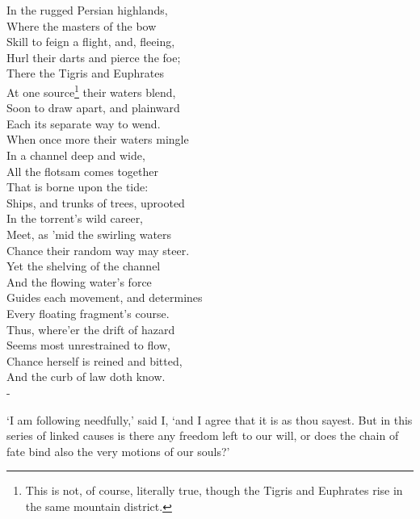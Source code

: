 \documentclass[12pt]{book}
\newenvironment{ipoem}[1]%
  {\setcounter{poemindentevery}{#1}\begin{poem}\small}%
  {\end{poem}\setcounter{poemindentevery}{0}}
\begin{document}
\begin{ipoem}{2}
    In the rugged Persian highlands, \\
      Where the masters of the bow \\
    Skill to feign a flight, and, fleeing, \\
      Hurl their darts and pierce the foe; \\
    There the Tigris and Euphrates \\
      At one source\footnote{This is not, of course, literally true, though the Tigris and Euphrates rise in the same mountain district.} their waters blend, \\
    Soon to draw apart, and plainward \\
      Each its separate way to wend. \\
    When once more their waters mingle \\
      In a channel deep and wide, \\
    All the flotsam comes together \\
      That is borne upon the tide: \\
    Ships, and trunks of trees, uprooted \\
      In the torrent's wild career, \\
    Meet, as 'mid the swirling waters \\
      Chance their random way may steer. \\
    Yet the shelving of the channel \\
      And the flowing water's force \\
    Guides each movement, and determines \\
      Every floating fragment's course. \\
    Thus, where'er the drift of hazard \\
      Seems most unrestrained to flow, \\
    Chance herself is reined and bitted, \\
      And the curb of law doth know. \\-
\end{ipoem}


`I am following needfully,' said I, `and I agree that it is as thou
sayest. But in this series of linked causes is there any freedom left to
our will, or does the chain of fate bind also the very motions of our
souls?'
\end{document}
